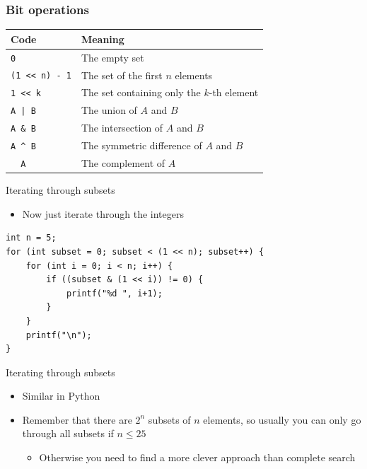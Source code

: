\documentclass{beamer}
\begin{document}
\begin{frame}[plain]
	\frametitle{Bit operations}
	\begin{tabular}{|l|l|}
	\hline
	Code & Meaning \\
	\hline
	\texttt{0} & The empty set \\
	\texttt{(1 <{}< n) - 1} & The set of the first $n$ elements \\
	\texttt{1 <{}< k} & The set containing only the $k$-th element \\
	\texttt{A | B} & The union of $A$ and $B$ \\
	\texttt{A \& B} & The intersection of $A$ and $B$ \\
	\texttt{A \string^ B} & The symmetric difference of $A$ and $B$ \\
	\texttt{\string~ A} & The complement of $A$ \\
	\hline
	\end{tabular}
\end{frame}

\begin{frame}{Iterating through subsets}
    \begin{itemize}
        \item Now just iterate through the integers
    \end{itemize}

            \begin{verbatim}
int n = 5;
for (int subset = 0; subset < (1 << n); subset++) {
    for (int i = 0; i < n; i++) {
        if ((subset & (1 << i)) != 0) {
            printf("%d ", i+1);
        }
    }
    printf("\n");
}
            \end{verbatim}
\end{frame}

\begin{frame}[plain]{Iterating through subsets}
    \begin{itemize}
        \item Similar in Python
        \vspace{20pt}
        \item Remember that there are $2^n$ subsets of $n$ elements, so usually you can only go through all subsets if $n \leq 25$
            \begin{itemize}
                \item Otherwise you need to find a more clever approach than complete search
            \end{itemize}
            \vspace{20pt}
    \end{itemize}
\end{frame}
\end{document}
